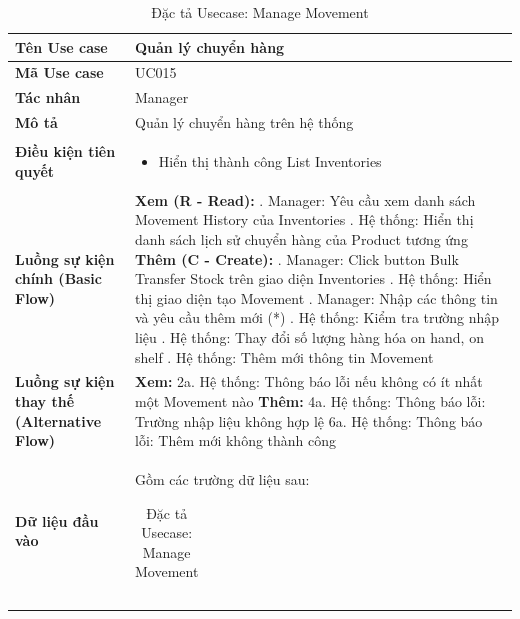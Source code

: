 \documentclass[12pt,a4paper]{report}
\begin{document}
\begin{longtable}{|>{\raggedright\arraybackslash\bfseries}p{4.5cm}|p{11cm}|}
\caption{Đặc tả Usecase: Manage Movement} \label{tab:uc_manage_movement} \\
\hline
Tên Use case & Quản lý chuyển hàng \\ \hline
Mã Use case & UC015 \\ \hline
Tác nhân & Manager \\ \hline
Mô tả & Quản lý chuyển hàng trên hệ thống \\ \hline
Điều kiện tiên quyết & 
\begin{itemize}[leftmargin=*, nosep, topsep=0pt, partopsep=0pt]
    \item Hiển thị thành công List Inventories
\end{itemize} \\ \hline
Luồng sự kiện chính (Basic Flow) & 
\textbf{Xem (R - Read):} \newline
1. Manager: Yêu cầu xem danh sách Movement History của Inventories \newline
2. Hệ thống: Hiển thị danh sách lịch sử chuyển hàng của Product tương ứng \newline
\textbf{Thêm (C - Create):} \newline
1. Manager: Click button Bulk Transfer Stock trên giao diện Inventories \newline
2. Hệ thống: Hiển thị giao diện tạo Movement \newline
3. Manager: Nhập các thông tin và yêu cầu thêm mới (*) \newline
4. Hệ thống: Kiểm tra trường nhập liệu \newline
5. Hệ thống: Thay đổi số lượng hàng hóa on hand, on shelf \newline
6. Hệ thống: Thêm mới thông tin Movement \\ \hline
Luồng sự kiện thay thế (Alternative Flow) & 
\textbf{Xem:} \newline
2a. Hệ thống: Thông báo lỗi nếu không có ít nhất một Movement nào \newline
\textbf{Thêm:} \newline
4a. Hệ thống: Thông báo lỗi: Trường nhập liệu không hợp lệ \newline
6a. Hệ thống: Thông báo lỗi: Thêm mới không thành công \\ \hline
Dữ liệu đầu vào & 
Gồm các trường dữ liệu sau:\newline
\vspace{0.1cm}
\begin{tabular}{|p{3.5cm}|p{2.5cm}|p{4cm}|}

\end{tabular}
\end{longtable}
\end{document}
